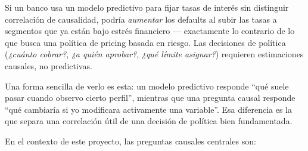 \documentclass[
  spanish,
  11pt,
  letterpaper,
]{scrbook}
\theoremstyle{plain}
\theoremstyle{remark}
\begin{document}
\begin{tcolorbox}[enhanced jigsaw, arc=.35mm, bottomrule=.15mm, bottomtitle=1mm, breakable, colback=white, colbacktitle=quarto-callout-warning-color!10!white, colframe=quarto-callout-warning-color-frame, coltitle=black, left=2mm, leftrule=.75mm, opacityback=0, opacitybacktitle=0.6, rightrule=.15mm, title=\textcolor{quarto-callout-warning-color}{\faExclamationTriangle}\hspace{0.5em}{Peligro de decisiones basadas en correlación}, titlerule=0mm, toprule=.15mm, toptitle=1mm]

Si un banco usa un modelo predictivo para fijar tasas de interés sin
distinguir correlación de causalidad, podría \emph{aumentar} los
defaults al subir las tasas a segmentos que ya están bajo estrés
financiero --- exactamente lo contrario de lo que busca una política de
pricing basada en riesgo. Las decisiones de política (\emph{¿cuánto
cobrar?}, \emph{¿a quién aprobar?}, \emph{¿qué límite asignar?})
requieren estimaciones causales, no predictivas.

\end{tcolorbox}

Una forma sencilla de verlo es esta: un modelo predictivo responde ``qué
suele pasar cuando observo cierto perfil'', mientras que una pregunta
causal responde ``qué cambiaría si yo modificara activamente una
variable''. Esa diferencia es la que separa una correlación útil de una
decisión de política bien fundamentada.

En el contexto de este proyecto, las preguntas causales centrales son:
\end{document}
